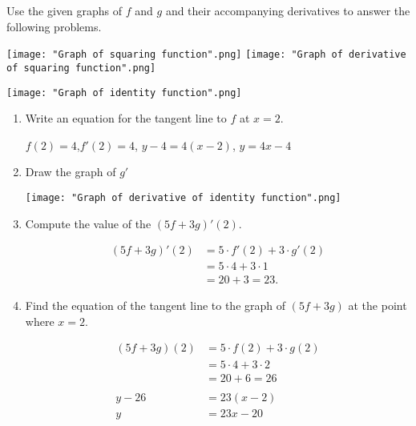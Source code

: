 \documentclass[nooutcomes,handout]{ximera}
\begin{document}
\begin{problem}

  Use the given graphs of $f$ and $g$ and their accompanying derivatives to answer the following problems.
  \begin{image}
    \hspace*{-7em}
     \texttt{[image: "Graph of squaring function".png]}
     \hspace{2em}
     \texttt{[image: "Graph of derivative of squaring function".png]}
   \end{image}
   \begin{image}
     \texttt{[image: "Graph of identity function".png]}
   \end{image}

   \begin{enumerate}
     \item
	Write an equation for the tangent line to $f$ at $x=2$.

	\begin{freeResponse}
	$f(2)=4$,\quad $f'(2)=4$, \quad $y-4=4(x-2)$, \quad $y=4x-4$
	\end{freeResponse}

	\item Draw the graph of $g'$
		\begin{freeResponse}
	   \begin{image}
     \texttt{[image: "Graph of derivative of identity function".png]}
   \end{image}	
		\end{freeResponse}
       \item Compute the value of the $(5f+3g)'(2)$.

       \begin{freeResponse}
         \begin{align*}
           (5f+3g)'(2) &= 5\cdot f'(2) + 3 \cdot g'(2)\\
                       &= 5 \cdot 4 + 3 \cdot 1 \\
                       &= 20 + 3 = 23.
         \end{align*}
       \end{freeResponse}

	\item Find the equation of the tangent line to the graph of $(5f+3g)$ at the point where $x=2$.

	\begin{freeResponse}
         \begin{align*}
           (5f+3g)(2) &= 5\cdot f(2) + 3 \cdot g(2)\\
                       &= 5 \cdot 4 + 3 \cdot 2 \\
                       &= 20 + 6 = 26\\\\
	y-26 &=23(x-2)\\
	y&=23x-20
         \end{align*}
	\end{freeResponse}


\end{enumerate}
\end{problem}
\end{document}
